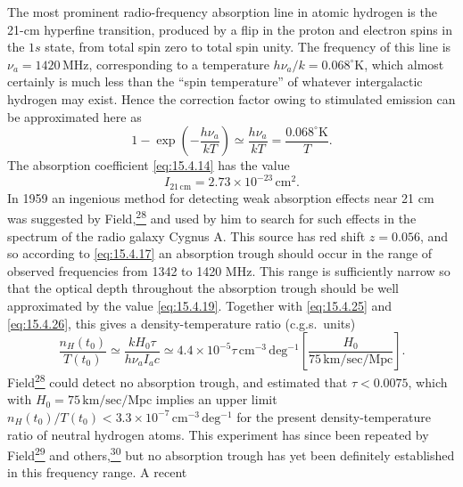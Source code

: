 The most prominent radio-frequency absorption line in atomic hydrogen is the
21-cm hyperfine transition, produced by a flip in the proton and electron spins
in the \(1s\) state, from total spin zero to total spin unity. The frequency of
this line is \(\nu_a=1420\,\mathrm{MHz}\), corresponding to a temperature
\(h\nu_a/k=0.068^\circ\mathrm{K}\), which almost certainly is much less than
the ``spin temperature'' of whatever intergalactic hydrogen may exist. Hence
the correction factor owing to stimulated emission can be approximated here as
\begin{equation}
  1-\exp\left(-\frac{h\nu_a}{kT}\right)
  \simeq
  \frac{h\nu_a}{kT}
  =
  \frac{0.068^\circ\mathrm{K}}{T}.
  \tag{15.4.25}\label{eq:15.4.25}
\end{equation}
The absorption coefficient \eqref{eq:15.4.14} has the value
\begin{equation}
  I_{21\,\mathrm{cm}}=2.73\times10^{-23}\,\mathrm{cm^2}.
  \tag{15.4.26}\label{eq:15.4.26}
\end{equation}
In 1959 an ingenious method for detecting weak absorption effects near 21 cm
was suggested by Field,\hyperref[ch15-ref-28]{\textsuperscript{28}} and used
by him to search for such effects in the spectrum of the radio galaxy Cygnus
A. This source has red shift \(z=0.056\), and so according to
\eqref{eq:15.4.17} an absorption trough should occur in the range of observed
frequencies from 1342 to 1420 MHz. This range is sufficiently narrow so that
the optical depth throughout the absorption trough should be well approximated
by the value \eqref{eq:15.4.19}. Together with \eqref{eq:15.4.25} and
\eqref{eq:15.4.26}, this gives a density-temperature ratio (c.g.s.\ units)
\begin{equation}
  \frac{n_H(t_0)}{T(t_0)}
  \simeq
  \frac{kH_0\tau}{h\nu_aI_ac}
  \simeq
  4.4\times10^{-5}\tau\,\mathrm{cm^{-3}\,deg^{-1}}
  \left[
    \frac{H_0}{75\,\mathrm{km/sec/Mpc}}
  \right].
  \tag{15.4.27}\label{eq:15.4.27}
\end{equation}
Field\hyperref[ch15-ref-28]{\textsuperscript{28}} could detect no absorption
trough, and estimated that \(\tau<0.0075\), which with
\(H_0=75\,\mathrm{km/sec/Mpc}\) implies an upper limit
\(n_H(t_0)/T(t_0)<3.3\times10^{-7}\,\mathrm{cm^{-3}\,deg^{-1}}\) for the
present density-temperature ratio of neutral hydrogen atoms. This experiment
has since been repeated by Field\hyperref[ch15-ref-29]{\textsuperscript{29}}
and others,\hyperref[ch15-ref-30]{\textsuperscript{30}} but no absorption
trough has yet been definitely established in this frequency range. A recent
